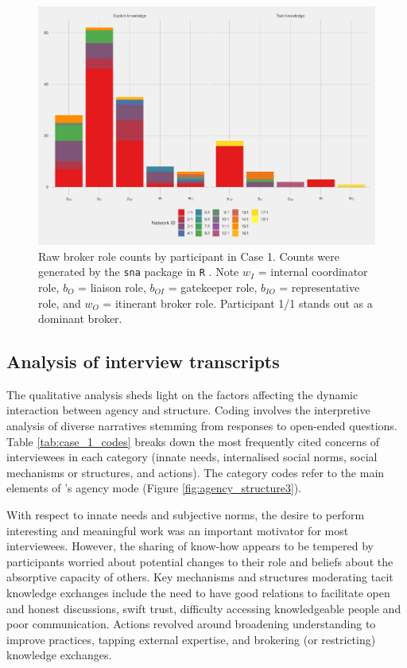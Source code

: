 \begin{figure}[hbt!]
\centering
\includegraphics[width = \textwidth]{Images/gf_case1.pdf}
\caption[Raw broker role counts by participant in Case 1]{Raw broker role counts by participant in Case 1. Counts were generated by the \texttt{sna} package in \texttt{R} \citep{butts2016sna}. Note $w_I$ = internal coordinator role, $b_O$ = liaison role, $b_{OI}$ = gatekeeper role, $b_{IO}$ = representative role, and $w_O$ = itinerant broker role. Participant 1/1 stands out as a dominant broker.}
\label{fig:gf_c1}
\end{figure}

\subsection{Analysis of interview transcripts}

The qualitative analysis sheds light on the factors affecting the dynamic interaction between agency and structure. Coding involves the interpretive analysis of diverse narratives stemming from responses to open-ended questions. Table \ref{tab:case_1_codes} breaks down the most frequently cited concerns of interviewees in each category (innate needs, internalised social norms, social mechanisms or structures, and actions). The category codes refer to the main elements of \citeauthor{loyal2001agency}'s \citeyearpar{loyal2001agency} agency mode (Figure \ref{fig:agency_structure3}). \medskip

With respect to innate needs and subjective norms, the desire to perform interesting and meaningful work was an important motivator for most interviewees. However, the sharing of know-how appears to be tempered by participants worried about potential changes to their role and beliefs about the absorptive capacity of others. Key mechanisms and structures moderating tacit knowledge exchanges include the need to have good relations to facilitate open and honest discussions, swift trust, difficulty accessing knowledgeable people and poor communication. Actions revolved around broadening understanding to improve practices, tapping external expertise, and brokering (or restricting) knowledge exchanges. 

